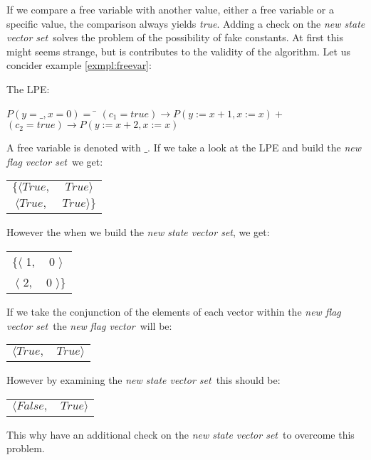 \documentclass[a4paper,10pt]{article}
\newcommand{\ti}{\textit}
\newcommand{\fv}{\textit{flag vector}}
\newcommand{\svs}{\textit{new state vector set}}
\newcommand{\fvs}{\textit{new flag vector set}}
\begin{document}
If we compare a free variable with another value, either a free variable or a specific value, the comparison always yields \ti{true}. Adding a check on the \svs\ solves the problem of the possibility of fake constants. At first this might seems strange, but is contributes to the validity of the algorithm. Let us concider example \ref{exmpl:freevar}:
\begin{example}\label{exmpl:freevar} The LPE: 
\begin{tabbing}
$P(y = \_,x = 0) =$ \= $(c_1 = true) \rightarrow  P(y := x+1, x := x) + $ \\
	    \> $(c_2 = true)
 \rightarrow P(y := x+2, x := x)$
\end{tabbing}

A free variable is denoted with $\_$. If we take a look at the LPE and build the \fvs\ we get:
\begin{center}
\begin{tabular}{cc} 
 $\lbrace \langle True, $ & $ True \rangle$\\
 $\langle True, $ & $ True \rangle \rbrace$\\
\end{tabular} 
\end{center}

However the when we build the \svs , we get:
\begin{center}
\begin{tabular}{cc} 
 $\lbrace \langle$ 1, & 0 $\rangle$\\
 $\langle$ 2, & 0 $\rangle \rbrace$\\
\end{tabular}  
\end{center}

If we take the conjunction of the elements of each vector within the \fvs\ the \ti{new} \fv\ will be:
\begin{center}
\begin{tabular}{cc} 
 $\langle True, $ & $ True \rangle$\\
\end{tabular}
\end{center}

However by examining the \svs\ this should be: 
\begin{center}
\begin{tabular}{cc} 
 $\langle False, $ & $ True \rangle$\\
\end{tabular}
\end{center}

This why have an additional check on the \svs\ to overcome this problem.
\end{example}
\end{document}
